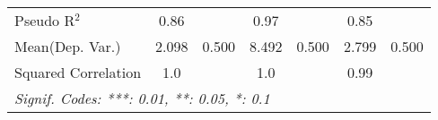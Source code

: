 \begin{tabular}{lcccccc}
   Pseudo R$^2$                                               & 0.86          &      & 0.97          &      & 0.85          & \\  
Mean(Dep. Var.) & 2.098 & 0.500 & 8.492 & 0.500 & 2.799 & 0.500 \\
   Squared Correlation                                        & 1.0           &      & 1.0           &      & 0.99          & \\  
   \midrule \midrule
   \multicolumn{7}{l}{\emph{Signif. Codes: ***: 0.01, **: 0.05, *: 0.1}}\\
\end{tabular}
\par\endgroup
